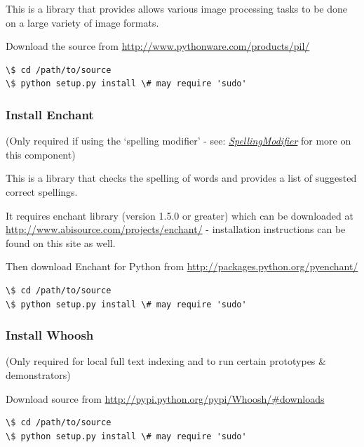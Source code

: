 \documentclass[letterpaper,10pt,english]{sphinxmanual}
\begin{document}
This is a library that provides allows various image processing tasks to be done on a large variety of image formats.

Download the source from \href{http://www.pythonware.com/products/pil/}{http://www.pythonware.com/products/pil/}

\begin{Verbatim}[commandchars=\\\{\}]
\$ cd /path/to/source
\$ python setup.py install \# may require 'sudo'
\end{Verbatim}


\subsubsection{Install Enchant}
\label{installation:install-enchant}
(Only required if using the `spelling modifier' - see: {\hyperref[api3.0:puppy-spelling-mod]{\emph{SpellingModifier}}} for more on this component)

This is a library that checks the spelling of words and provides a list of suggested correct spellings.

It requires enchant library (version 1.5.0 or greater) which can be downloaded at \href{http://www.abisource.com/projects/enchant/}{http://www.abisource.com/projects/enchant/} - installation instructions can be found on this site as well.

Then download Enchant for Python from \href{http://packages.python.org/pyenchant/}{http://packages.python.org/pyenchant/}

\begin{Verbatim}[commandchars=\\\{\}]
\$ cd /path/to/source
\$ python setup.py install \# may require 'sudo'
\end{Verbatim}


\subsubsection{Install Whoosh}
\label{installation:install-whoosh}
(Only required for local full text indexing and to run certain prototypes \& demonstrators)

Download source from \href{http://pypi.python.org/pypi/Whoosh/\#downloads}{http://pypi.python.org/pypi/Whoosh/\#downloads}

\begin{Verbatim}[commandchars=\\\{\}]
\$ cd /path/to/source
\$ python setup.py install \# may require 'sudo'
\end{Verbatim}
\end{document}
